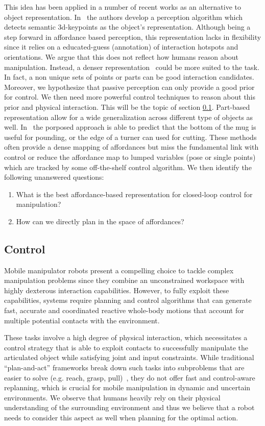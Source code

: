 This idea has been applied in a number of recent works as an alternative to object representation. In~\cite{gao2021kpam} the authors develop a perception algorithm which detects semantic 3d-keypoints as the object's representation. Although being a step forward in affordance based perception, this representation lacks in flexibility since it relies on a educated-guess (annotation) of interaction hotspots and orientations. We argue that this does not reflect how humans reason about manipulation. Instead, a denser representation~\cite{nagarajan2019grounded, mo2021where2act} could be more suited to the task. In fact, a non unique sets of points or parts can be good interaction candidates. Moreover, we hypothesize that passive perception can only provide a good prior for control. We then need more powerful control techniques to reason about this prior and physical interaction. This will be the topic of section \ref{sec:related_work_control}. Part-based representation allow for a wide generalization across different type of objects as well. In~\cite{myers2015affordance} the porposed approach is able to predict that the bottom of the mug is useful for pounding, or the edge of a turner can used for cutting. These methods often provide a dense mapping of affordances but miss the fundamental link with control or reduce the affordance map to lumped variables (pose or single points) which are tracked by some off-the-shelf control algorithm. We then identify the following unanswered questions:
\begin{enumerate}
\item What is the best affordance-based representation for closed-loop control for manipulation? 
\item How can we directly plan in the space of affordances?
\end{enumerate} 
 
\subsection{Control} \label{sec:related_work_control}
Mobile manipulator robots present a compelling choice to tackle complex manipulation problems since they combine an unconstrained workspace with highly dexterous interaction capabilities. However, to fully exploit these capabilities, systems require planning and control algorithms that can generate fast, accurate and coordinated reactive whole-body motions that account for multiple potential contacts with the environment. 

These tasks involve a high degree of physical interaction, which necessitates a control strategy that is able to exploit contacts to successfully manipulate the articulated object while satisfying joint and input constraints. While traditional ``plan-and-act'' frameworks break down such tasks into subproblems that are easier to solve (e.g. reach, grasp, pull)~\cite{Murali2020}, they do not offer fast and control-aware replanning, which is crucial for mobile manipulation  in dynamic and uncertain environments. We observe that humans heavily rely on their physical understanding of the surrounding environment and thus we believe that a robot needs to consider this aspect as well when planning for the optimal action.

